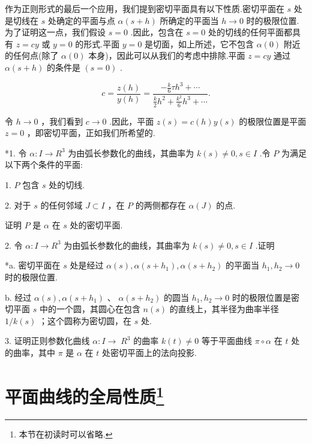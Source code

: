 作为正则形式的最后一个应用，我们提到密切平面具有以下性质.密切平面在 \(s\) 处是切线在 \(s\) 处确定的平面与点 \(\alpha \left( {s + h}\right)\) 所确定的平面当 \(h \rightarrow  0\) 时的极限位置.为了证明这一点，我们假设 \(s = 0\) .因此，包含在 \(s = 0\) 处的切线的任何平面都具有 \(z = {cy}\) 或 \(y = 0\) 的形式.平面 \(y = 0\) 是切面，如上所述，它不包含 \(\alpha \left( 0\right)\) 附近的任何点(除了 \(\alpha \left( 0\right)\) 本身)，因此可以从我们的考虑中排除.平面 \(z = {cy}\) 通过 \(\alpha \left( {s + h}\right)\) 的条件是 \(\left( {s = 0}\right)\) .

\[
c = \frac{z\left( h\right) }{y\left( h\right) } = \frac{-\frac{k}{6}\tau {h}^{3} + \cdots }{\frac{k}{2}{h}^{2} + \frac{{k}^{2}}{6}{h}^{3} + \cdots }.
\]

令 \(h \rightarrow  0\) ，我们看到 \(c \rightarrow  0\) .因此，平面 \(z\left( s\right)  = c\left( h\right) y\left( s\right)\) 的极限位置是平面 \(z = 0\) ，即密切平面，正如我们所希望的.

\exerciseline

*1. 令 \(\alpha  : I \rightarrow  {R}^{3}\) 为由弧长参数化的曲线，其曲率为 \(k\left( s\right)  \neq  0,s \in  I\) .令 \(P\) 为满足以下两个条件的平面:

1. \(P\) 包含 \(s\) 处的切线.

2. 对于 \(s\) 的任何邻域 \(J \subset  I\) ，在 \(P\) 的两侧都存在 \(\alpha \left( J\right)\) 的点.

证明 \(P\) 是 \(\alpha\) 在 \(s\) 处的密切平面.

2. 令 \(\alpha  : I \rightarrow  {R}^{3}\) 为由弧长参数化的曲线，其曲率为 \(k\left( s\right)  \neq  0,s \in  I\) .证明

*a. 密切平面在 \(s\) 处是经过 \(\alpha \left( s\right) ,\alpha \left( {s + {h}_{1}}\right) ,\alpha \left( {s + {h}_{2}}\right)\) 的平面当 \({h}_{1},{h}_{2} \rightarrow  0\) 时的极限位置.

b. 经过 \(\alpha \left( s\right) ,\alpha \left( {s + {h}_{1}}\right)\) 、 \(\alpha \left( {s + {h}_{2}}\right)\) 的圆当 \({h}_{1},{h}_{2} \rightarrow  0\) 时的极限位置是密切平面 \(s\) 中的一个圆，其圆心在包含 \(n\left( s\right)\) 的直线上，其半径为曲率半径 \(1/k\left( s\right)\) ；这个圆称为密切圆，在 \(s\) 处.

3. 证明正则参数化曲线 \(\alpha  : I \rightarrow \; {R}^{3}\) 的曲率 \(k\left( t\right)  \neq  0\) 等于平面曲线 \(\pi  \circ  \alpha\) 在 \(t\) 处的曲率，其中 \(\pi\) 是 \(\alpha\) 在 \(t\) 处密切平面上的法向投影.

\section{平面曲线的全局性质\footnote{本节在初读时可以省略.}}

